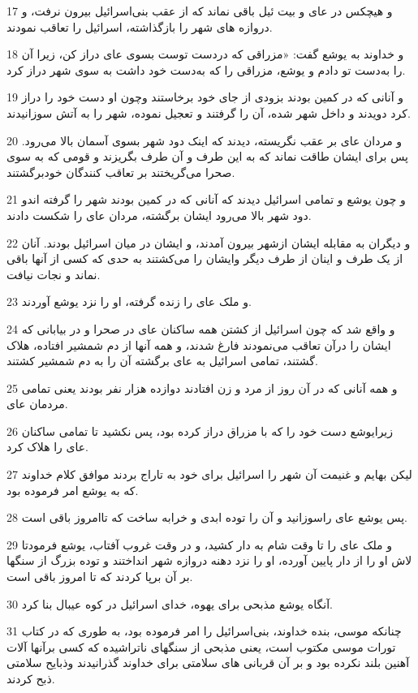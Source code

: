 \par 17 و هیچکس در عای و بیت ئیل باقی نماند که از عقب بنی‌اسرائیل بیرون نرفت، و دروازه های شهر را بازگذاشته، اسرائیل را تعاقب نمودند.
\par 18 و خداوند به یوشع گفت: «مزراقی که دردست توست بسوی عای دراز کن، زیرا آن را به‌دست تو دادم و یوشع، مزراقی را که به‌دست خود داشت به سوی شهر دراز کرد.
\par 19 و آنانی که در کمین بودند بزودی از جای خود برخاستند وچون او دست خود را دراز کرد دویدند و داخل شهر شده، آن را گرفتند و تعجیل نموده، شهر را به آتش سوزانیدند.
\par 20 و مردان عای بر عقب نگریسته، دیدند که اینک دود شهر بسوی آسمان بالا می‌رود. پس برای ایشان طاقت نماند که به این طرف و آن طرف بگریزند و قومی که به سوی صحرا می‌گریختند بر تعاقب کنندگان خودبرگشتند.
\par 21 و چون یوشع و تمامی اسرائیل دیدند که آنانی که در کمین بودند شهر را گرفته اندو دود شهر بالا می‌رود ایشان برگشته، مردان عای را شکست دادند.
\par 22 و دیگران به مقابله ایشان ازشهر بیرون آمدند، و ایشان در میان اسرائیل بودند. آنان از یک طرف و اینان از طرف دیگر وایشان را می‌کشتند به حدی که کسی از آنها باقی نماند و نجات نیافت.
\par 23 و ملک عای را زنده گرفته، او را نزد یوشع آوردند.
\par 24 و واقع شد که چون اسرائیل از کشتن همه ساکنان عای در صحرا و در بیابانی که ایشان را درآن تعاقب می‌نمودند فارغ شدند، و همه آنها از دم شمشیر افتاده، هلاک گشتند، تمامی اسرائیل به عای برگشته آن را به دم شمشیر کشتند.
\par 25 و همه آنانی که در آن روز از مرد و زن افتادند دوازده هزار نفر بودند یعنی تمامی مردمان عای.
\par 26 زیرایوشع دست خود را که با مزراق دراز کرده بود، پس نکشید تا تمامی ساکنان عای را هلاک کرد.
\par 27 لیکن بهایم و غنیمت آن شهر را اسرائیل برای خود به تاراج بردند موافق کلام خداوند که به یوشع امر فرموده بود.
\par 28 پس یوشع عای راسوزانید و آن را توده ابدی و خرابه ساخت که تاامروز باقی است.
\par 29 و ملک عای را تا وقت شام به دار کشید، و در وقت غروب آفتاب، یوشع فرمودتا لاش او را از دار پایین آورده، او را نزد دهنه دروازه شهر انداختند و توده بزرگ از سنگها بر آن برپا کردند که تا امروز باقی است.
\par 30 آنگاه یوشع مذبحی برای یهوه، خدای اسرائیل در کوه عیبال بنا کرد.
\par 31 چنانکه موسی، بنده خداوند، بنی‌اسرائیل را امر فرموده بود، به طوری که در کتاب تورات موسی مکتوب است، یعنی مذبحی از سنگهای ناتراشیده که کسی برآنها آلات آهنین بلند نکرده بود و بر آن قربانی های سلامتی برای خداوند گذرانیدند وذبایح سلامتی ذبح کردند.
